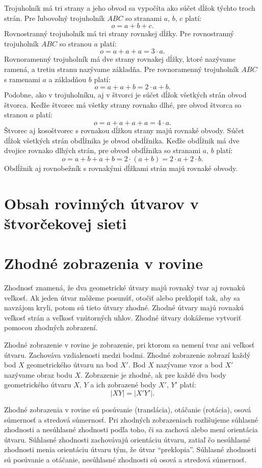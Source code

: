 \documentclass{article}
\begin{document}
Trojuholník má tri strany a jeho obvod sa vypočíta ako súčet dĺžok týchto troch strán. Pre ľubovoľný trojuholník \(ABC\) so stranami \(a\), \(b\), \(c\) platí:
\[
o = a + b + c.
\]
Rovnostranný trojuholník má tri strany rovnakej dĺžky. Pre rovnostranný trojuholník \(ABC\) so stranou \(a\) platí:
\[
o = a + a + a = 3 \cdot a.
\]
Rovnoramenný trojuholník má dve strany rovnakej dĺžky, ktoré nazývame ramená, a tretiu stranu nazývame základňa. Pre rovnoramenný trojuholník \(ABC\) s ramenami \(a\) a základňou \(b\) platí:
\[
o = a + a + b = 2 \cdot a + b.
\]
Podobne, ako v trojuholníku, aj v štvorci je súčet dĺžok všetkých strán obvod štvorca. Keďže štvorec má všetky strany rovnako dlhé, pre obvod štvorca so stranou \(a\) platí:
\[
o = a + a + a + a = 4 \cdot a.
\]
Štvorec aj kosoštvorec s rovnakou dĺžkou strany majú rovnaké obvody.
Súčet dĺžok všetkých strán obdĺžnika je obvod obdĺžnika. Keďže obdĺžnik má dve dvojice rovnako dlhých strán, pre obvod obdĺžnika so stranami \(a\), \(b\) platí:
\[
o = a + b + a + b = 2 \cdot (a + b) = 2 \cdot a + 2 \cdot b.
\]
Obdĺžnik aj rovnobežník s rovnakými dĺžkami strán majú rovnaké obvody.

\section{Obsah rovinných útvarov v štvorčekovej sieti}

\section{Zhodné zobrazenia v rovine}

Zhodnosť znamená, že dva geometrické útvary majú rovnaký tvar aj rovnakú veľkosť. Ak jeden útvar môžeme posunúť, otočiť alebo preklopiť tak, aby sa navzájom kryli, potom sú tieto útvary zhodné. Zhodné útvary majú rovnakú veľkosť strán a veľkosť vnútorných uhlov. Zhodné útvary dokážeme vytvoriť pomocou zhodných zobrazení.

Zhodné zobrazenie v rovine je zobrazenie, pri ktorom sa nemení tvar ani veľkosť útvaru. Zachováva vzdialenosti medzi bodmi. Zhodné zobrazenie zobrazí každý bod \(X\) geometrického útvaru na bod \(X'\). Bod \(X\) nazývame vzor a bod \(X'\) nazývame obraz bodu \(X\). Zobrazenie je zhodné, ak pre každé dva body geometrického útvaru \(X\), \(Y\) a ich zobrazené body \(X'\), \(Y'\) platí:
\[
|XY| = |X'Y'|.
\]

Zhodné zobrazenia v rovine sú posúvanie (translácia), otáčanie (rotácia), osová súmernosť a stredová súmernosť. Pri zhodných zobrazeniach rozlišujeme súhlasné zhodnosti a nesúhlasné zhodnosti podľa toho, či sa zachová alebo mení orientácia útvaru. Súhlasné zhodnosti zachovávajú orientáciu útvaru, zatiaľ čo nesúhlasné zhodnosti menia orientáciu útvaru tým, že útvar \enquote{preklopia}. Súhlasné zhodnosti sú posúvanie a otáčanie, nesúhlasné zhodnosti sú osová a stredová súmernosť.
\end{document}
